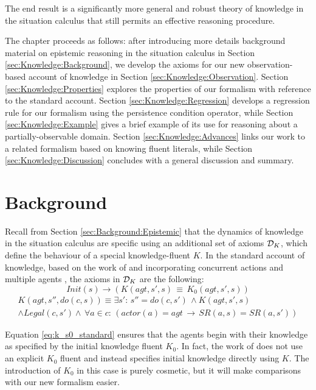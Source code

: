 The end result is a significantly more general and robust theory of
knowledge in the situation calculus that still permits an effective
reasoning procedure.

The chapter proceeds as follows: after introducing more details background
material on epistemic reasoning in the situation calculus in Section
\ref{sec:Knowledge:Background}, we develop the axioms for our new
observation-based account of knowledge in Section \ref{sec:Knowledge:Observation}.
Section \ref{sec:Knowledge:Properties} explores the properties of
our formalism with reference to the standard account. Section \ref{sec:Knowledge:Regression}
develops a regression rule for our formalism using the persistence
condition operator, while Section \ref{sec:Knowledge:Example} gives
a brief example of its use for reasoning about a partially-observable
domain. Section \ref{sec:Knowledge:Advances} links our work to a
related formalism based on knowing fluent literals, while Section
\ref{sec:Knowledge:Discussion} concludes with a general discussion
and summary.


\section{Background\label{sec:Knowledge:Background}}

Recall from Section \ref{sec:Background:Epistemic} that the dynamics
of knowledge in the situation calculus are specific using an additional
set of axioms $\mathcal{D}_{K}$, which define the behaviour of a special
knowledge-fluent $K$. In the standard account of knowledge, based
on the work of \citet{scherl03sc_knowledge} and incorporating concurrent
actions and multiple agents \citep{shapiro98specifying_ma_systems,scherl03conc_knowledge},
the axioms in $\mathcal{D}_{K}$ are the following:\begin{equation}
Init(s)\rightarrow\left(K(agt,s',s)\,\equiv\, K_{0}(agt,s',s)\right)\label{eq:k_s0_standard}\end{equation}
 \begin{multline}
K(agt,s'',do(c,s))\equiv\exists s':\, s''=do(c,s')\,\wedge K(agt,s',s)\\
\wedge Legal(c,s')\wedge\,\forall a\in c:\,\left(actor(a)=agt\,\rightarrow\, SR(a,s)=SR(a,s')\right)\label{eq:k_ssa_standard}\end{multline}


Equation \eqref{eq:k_s0_standard} ensures that the agents begin with
their knowledge as specified by the initial knowledge fluent $K_{0}$.
In fact, the work of \citep{scherl03sc_knowledge,shapiro98specifying_ma_systems,scherl03conc_knowledge}
does not use an explicit $K_{0}$ fluent and instead specifies initial
knowledge directly using $K$. The introduction of $K_{0}$ in this
case is purely cosmetic, but it will make comparisons with our new
formalism easier.

